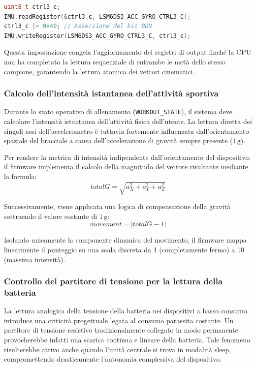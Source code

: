 \begin{lstlisting}[language=C++]
uint8_t ctrl3_c;
IMU.readRegister(&ctrl3_c, LSM6DS3_ACC_GYRO_CTRL3_C); 
ctrl3_c |= 0x40; // Asserzione del bit BDU
IMU.writeRegister(LSM6DS3_ACC_GYRO_CTRL3_C, ctrl3_c); 
\end{lstlisting}

Questa impostazione congela l'aggiornamento dei registri di output finché la CPU non ha completato la lettura sequenziale di entrambe le metà dello stesso campione, garantendo la lettura atomica dei vettori cinematici.

\subsubsection{Calcolo dell'intensità istantanea dell'attività sportiva}
Durante lo stato operativo di allenamento (\texttt{WORKOUT\_STATE}), il sistema deve calcolare l'intensità istantanea dell'attività fisica dell'utente.
La lettura diretta dei singoli assi dell'accelerometro è tuttavia fortemente influenzata dall'orientamento spaziale del bracciale a causa dell'accelerazione di gravità sempre presente ($1\,\text{g}$). 

Per rendere la metrica di intensità indipendente dall'orientamento del dispositivo, il firmware implementa il calcolo della magnitudo del vettore risultante mediante la formula:
\begin{equation}
    totalG = \sqrt{a_X^2 + a_Y^2 + a_Z^2}
\end{equation}

Successivamente, viene applicata una logica di compensazione della gravità sottraendo il valore costante di $1\,\text{g}$:
\begin{equation}
    movement = |totalG - 1|
\end{equation}

Isolando unicamente la componente dinamica del movimento, il firmware mappa linearmente il punteggio su una scala discreta da 1 (completamente fermo) a 10 (massima intensità).

\subsubsection{Controllo del partitore di tensione per la lettura della batteria}
La lettura analogica della tensione della batteria nei dispositivi a basso consumo introduce una criticità progettuale legata al consumo parassita costante.
Un partitore di tensione resistivo tradizionalmente collegato in modo permanente provocherebbe infatti una scarica continua e lineare della batteria.
Tale fenomeno risulterebbe attivo anche quando l'unità centrale si trova in modalità sleep, compromettendo drasticamente l'autonomia complessiva del dispositivo.

